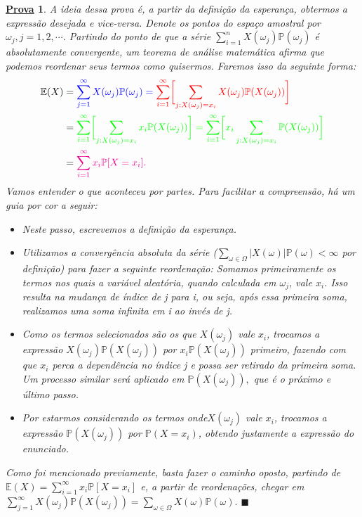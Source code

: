\documentclass{article}
\newtheorem*{proof*}{\underline{Prova}}
\renewcommand\qedsymbol{$\blacksquare$}
\begin{document}
\begin{proof*}
  A ideia dessa prova é, a partir da definição da esperança, obtermos a expressão desejada e vice-versa.
Denote os pontos do espaço amostral por \(\omega_{j}, j=1, 2, \cdots\). Partindo do ponto de que a série 
 \(\sum\limits_{i=1}^{n}X(\omega_{j})\mathbb{P}(\omega_{j})\) é absolutamente convergente, um teorema de análise
 matemática afirma que podemos reordenar seus termos como quisermos. Faremos isso da seguinte forma:
\begin{align*}
  \mathbb{E}(X) &= \color{blue}\sum\limits_{j=1}^{\infty}X(\omega_{j})\mathbb{P}(\omega_{j}) = \color{red}\sum\limits_{i=1}^{\infty}\biggl[\sum\limits_{j:X(\omega_{j})=x_{i}}^{}X(\omega_{j})\mathbb{P}(X(\omega_{j}))\biggr]\\
                &= \color{green}\sum\limits_{i=1}^{\infty}\biggl[\sum\limits_{j:X(\omega_{j}) = x_{i}}^{}x_{i}\mathbb{P}(X(\omega_{j}))\biggr]=\sum\limits_{i=1}^{\infty}\biggl[x_{i}\sum\limits_{j:X(\omega_{j})=x_{i}}^{}\mathbb{P}(X(\omega_{j}))\biggr]\\
                &= \color{magenta}\sum\limits_{i=1}^{\infty}x_{i}\mathbb{P}[X = x_{i}].
\end{align*}
  Vamos entender o que aconteceu por partes. Para facilitar a compreensão, há um guia por cor a seguir:
 \begin{itemize}
   \item[\textbf{Azul)}] Neste passo, escrevemos a definição da esperança.
   \item[\textbf{Vermelho)}] Utilizamos a convergência absoluta da série (\(\sum\limits_{\omega \in \Omega }^{}|X(\omega )|\mathbb{P}(\omega ) < \infty\) por definição) para
fazer a seguinte reordenação: Somamos primeiramente os termos nos quais a variável aleatória, quando calculada em \(\omega_{j}\), vale \(x_{i}\). Isso resulta na mudança de índice de j
para i, ou seja, após essa primeira soma, realizamos uma soma infinita em i ao invés de j.
   \item[\textbf{Verde)}] Como os termos selecionados são os que \(X(\omega_{j})\) vale \(x_{i}\), trocamos a expressão \(X(\omega_{j})\mathbb{P}(X(\omega_{j}))\) por
 \(x_{i}\mathbb{P}(X(\omega_{j}))\) primeiro, fazendo com que \(x_{i}\) perca a dependência no índice j e possa ser retirado da primeira soma. Um processo similar será aplicado em
 \(\mathbb{P}(X(\omega_{j})),\) que é o próximo e último passo.
   \item[\textbf{Magenta)}] Por estarmos considerando os termos onde\(X(\omega_{j})\) vale \(x_{i}\), trocamos a expressão \(\mathbb{P}(X(\omega_{j}))\) por \(\mathbb{P}(X = x_{i})\), 
obtendo justamente a expressão do enunciado.
 \end{itemize}
 Como foi mencionado previamente, basta fazer o caminho oposto, partindo de \(\mathbb{E}(X) = \sum\limits_{i=1}^{\infty}x_{i}\mathbb{P}[X=x_{i}]\) e, a partir de 
 reordenações, chegar em \(\sum\limits_{j=1}^{\infty}X(\omega_{j})\mathbb{P}(X(\omega_{j})) = \sum\limits_{\omega \in \Omega }^{}X(\omega )\mathbb{P}(\omega ).\) \qedsymbol
\end{proof*}
\end{document}
